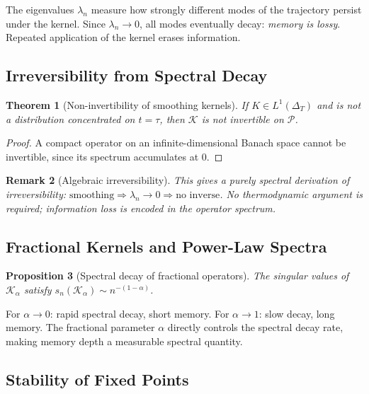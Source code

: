 \documentclass[12pt]{article}
\newtheorem{theorem}{Theorem}[section]
\newtheorem{proposition}[theorem]{Proposition}
\newtheorem{remark}[theorem]{Remark}
\newcommand{\Pcal}{\mathcal{P}}
\begin{document}
The eigenvalues $\lambda_n$ measure how strongly different modes of the
trajectory persist under the kernel. Since $\lambda_n \to 0$, all modes
eventually decay: \emph{memory is lossy}. Repeated application of the
kernel erases information.

\subsection{Irreversibility from Spectral Decay}

\begin{theorem}[Non-invertibility of smoothing kernels]
\label{thm:noninvertspectral}
If $K \in L^1(\Delta_T)$ and is not a distribution concentrated on $t = \tau$,
then $\mathcal{K}$ is not invertible on $\Pcal$.
\end{theorem}

\begin{proof}
A compact operator on an infinite-dimensional Banach space cannot be
invertible, since its spectrum accumulates at $0$.
\end{proof}

\begin{remark}[Algebraic irreversibility]
This gives a purely spectral derivation of irreversibility:
$\text{smoothing} \Rightarrow \lambda_n \to 0 \Rightarrow \text{no inverse}$.
No thermodynamic argument is required; information loss is encoded in the
operator spectrum.
\end{remark}

\subsection{Fractional Kernels and Power-Law Spectra}

\begin{proposition}[Spectral decay of fractional operators]
\label{prop:fractionalspec}
The singular values of $\mathcal{K}_\alpha$ satisfy
$s_n(\mathcal{K}_\alpha) \sim n^{-(1-\alpha)}$.
\end{proposition}

For $\alpha \to 0$: rapid spectral decay, short memory. For $\alpha \to 1$:
slow decay, long memory. The fractional parameter $\alpha$ directly controls
the spectral decay rate, making memory depth a measurable spectral quantity.

\subsection{Stability of Fixed Points}
\end{document}

